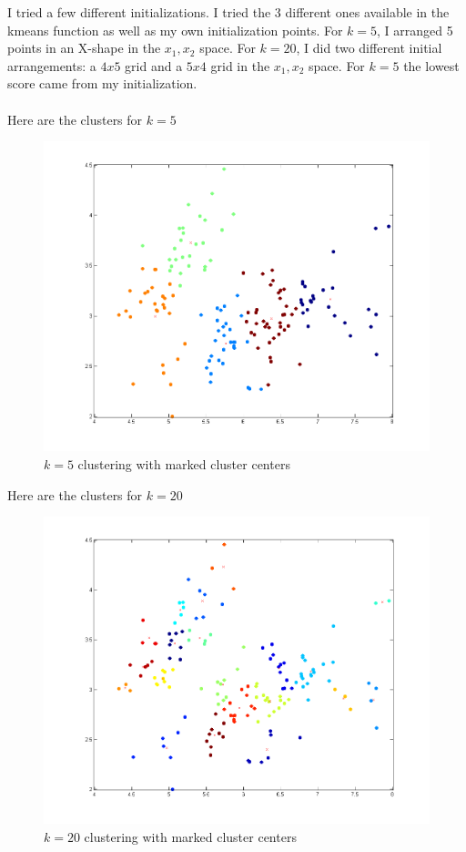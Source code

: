 \documentclass[twoside,11pt]{article}
\theoremstyle{definition}
\begin{document}
I tried a few different initializations. I tried the 3 different ones available in the kmeans function as well as my own initialization points. For $k=5$, I arranged 5 points in an X-shape in the $x_1,x_2$ space. For $k=20$, I did two different initial arrangements: a $4x5$ grid and a $5x4$ grid in the $x_1,x_2$ space. For $k=5$ the lowest score came from my initialization. \\
\\
Here are the clusters for $k=5$
\begin{figure}[h]
\centering
\includegraphics[width=6 in]{prob1PartB_1.png}
\caption{$k=5$ clustering with marked cluster centers}
\end{figure}

\newpage

Here are the clusters for $k=20$
\begin{figure}[h]
\centering
\includegraphics[width=6 in]{prob1PartB_2.png}
\caption{$k=20$ clustering with marked cluster centers}
\end{figure}

%
\end{document}

